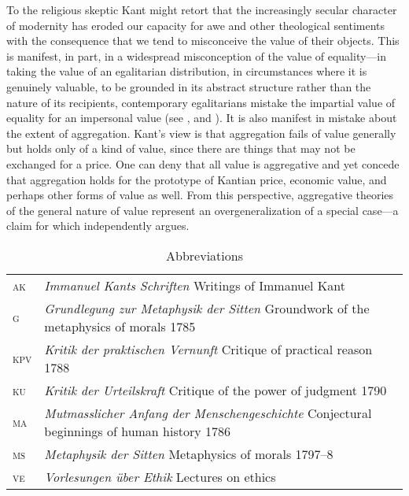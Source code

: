 \documentclass[12pt]{article}
\begin{document}
To the religious skeptic Kant might retort that the increasingly secular character of modernity has eroded our capacity for awe and other theological sentiments with the consequence that we tend to misconceive the value of their objects. This is manifest, in part, in a widespread misconception of the value of equality---in taking the value of an egalitarian distribution, in circumstances where it is genuinely valuable, to be grounded in its abstract structure rather than the nature of its recipients, contemporary egalitarians mistake the impartial value of equality for an impersonal value (see \citealt[section thirty]{Rawls:1971jz}, and \citealt{Munoz-Darde:2005ed}). It is also manifest in mistake about the extent of aggregation. Kant's view is that aggregation fails of value generally but holds only of a kind of value, since there are things that may not be exchanged for a price. One can deny that all value is aggregative and yet concede that aggregation holds for the prototype of Kantian price, economic value, and perhaps other forms of value as well. From this perspective, aggregative theories of the general nature of value represent an overgeneralization of a special case---a claim for which \citet{Raz:2000tm,Raz:2001ps} independently argues. 
\begin{table}
	[h] \setlength{\abovecaptionskip}{0pt} \setlength{\belowcaptionskip}{10pt} \caption{Abbreviations} 
	\begin{tabular*}
		{\textwidth}{lp{}}
	    \textsc{ak} & \emph{Immanuel Kants Schriften} Writings of Immanuel Kant\\
		\textsc{g} & \emph{Grundlegung zur Metaphysik der Sitten} Groundwork of the metaphysics of morals 1785\\
		\textsc{kpv} & \emph{Kritik der praktischen Vernunft} Critique of practical reason 1788\\
		\textsc{ku} & \emph{Kritik der Urteilskraft} Critique of the power of judgment 1790\\
		\textsc{ma} & \emph{Mutmasslicher Anfang der Menschengeschichte} Conjectural beginnings of human history 1786\\
		\textsc{ms} & \emph{Metaphysik der Sitten} Metaphysics of morals 1797--8\\
		\textsc{ve} & \emph{Vorlesungen \"uber Ethik} Lectures on ethics \\
	\end{tabular*}
\end{table}



 
 
\end{document}

